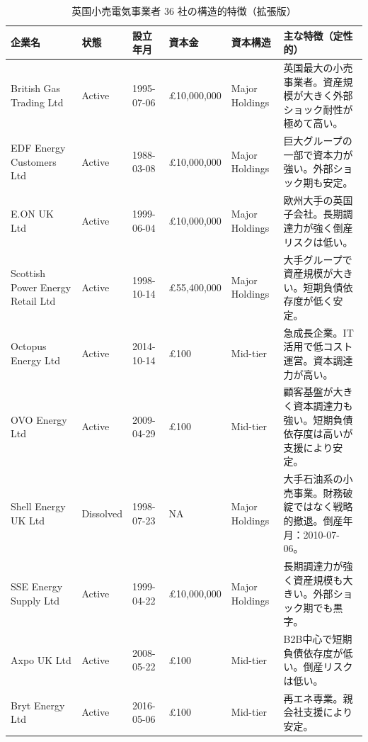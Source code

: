 \vspace{1em}

\begin{landscape}

\begin{table}[H]
\centering
\footnotesize
\caption{英国小売電気事業者 36 社の構造的特徴（拡張版）}

\begin{tabular}{p{3.2cm}p{1.4cm}p{1.8cm}p{1.8cm}p{2.2cm}p{10cm}}
\toprule
企業名 & 状態 & 設立年月 & 資本金 & 資本構造 & 主な特徴（定性的） \\
\midrule

British Gas Trading Ltd & Active & 1995-07-06 & £10,000,000 & Major Holdings &
英国最大の小売事業者。資産規模が大きく外部ショック耐性が極めて高い。 \\

EDF Energy Customers Ltd & Active & 1988-03-08 & £10,000,000 & Major Holdings &
巨大グループの一部で資本力が強い。外部ショック期も安定。 \\

E.ON UK Ltd & Active & 1999-06-04 & £10,000,000 & Major Holdings &
欧州大手の英国子会社。長期調達力が強く倒産リスクは低い。 \\

Scottish Power Energy Retail Ltd & Active & 1998-10-14 & £55,400,000 & Major Holdings &
大手グループで資産規模が大きい。短期負債依存度が低く安定。 \\

Octopus Energy Ltd & Active & 2014-10-14 & £100 & Mid-tier &
急成長企業。IT活用で低コスト運営。資本調達力が高い。 \\

OVO Energy Ltd & Active & 2009-04-29 & £100 & Mid-tier &
顧客基盤が大きく資本調達力も強い。短期負債依存度は高いが支援により安定。 \\

Shell Energy UK Ltd & Dissolved & 1998-07-23 & NA & Major Holdings &
大手石油系の小売事業。財務破綻ではなく戦略的撤退。倒産年月：2010-07-06。 \\

SSE Energy Supply Ltd & Active & 1999-04-22 & £10,000,000 & Major Holdings &
長期調達力が強く資産規模も大きい。外部ショック期でも黒字。 \\

Axpo UK Ltd & Active & 2008-05-22 & £100 & Mid-tier &
B2B中心で短期負債依存度が低い。倒産リスクは低い。 \\

Bryt Energy Ltd & Active & 2016-05-06 & £100 & Mid-tier &
再エネ専業。親会社支援により安定。 \\


\end{tabular}
\end{table}
\end{landscape}
